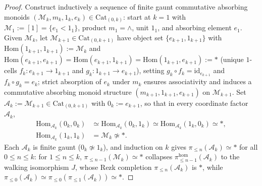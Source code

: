 \begin{proof}
Construct inductively a sequence of finite gaunt commutative absorbing monoids $(\mathcal{M}_k, m_k, 1_k, e_k) \in \mathrm{Cat}_{(0, k)}$: start at $k = 1$ with $\mathcal{M}_1 := [1] = \{e_1 < 1_1\}$, product $m_1 = \wedge$, unit $1_1$, and absorbing element $e_1$. Given $\mathcal{M}_k$, let $\mathcal{M}_{k+1} \in \mathrm{Cat}_{(0, k+1)}$ have object set $\{e_{k+1}, 1_{k+1}\}$ with $\mathrm{Hom}(1_{k+1}, 1_{k+1}) := \mathcal{M}_k$ and $\mathrm{Hom}(e_{k+1}, e_{k+1}) = \mathrm{Hom}(e_{k+1}, 1_{k+1}) = \mathrm{Hom}(1_{k+1}, e_{k+1}) := *$ (unique $1$-cells $f_k : e_{k+1} \to 1_{k+1}$ and $g_k : 1_{k+1} \to e_{k+1}$), setting $g_k \circ f_k = \mathrm{id}_{e_{k+1}}$ and $f_k \circ g_k = e_k$; strict absorption of $e_k$ under $m_k$ ensures associativity and induces a commutative absorbing monoid structure $(m_{k+1}, 1_{k+1}, e_{k+1})$ on $\mathcal{M}_{k+1}$. Set $\mathcal{A}_k := \mathcal{M}_{k+1} \in \mathrm{Cat}_{(0, k+1)}$ with $0_k := e_{k+1}$, so that in every coordinate factor $\mathcal{A}_k$,
\[
  \begin{aligned}
    \mathrm{Hom}_{\mathcal{A}_k}(0_k, 0_k) &\simeq \mathrm{Hom}_{\mathcal{A}_k}(0_k, 1_k) \simeq \mathrm{Hom}_{\mathcal{A}_k}(1_k, 0_k) \simeq *, \\
    \mathrm{Hom}_{\mathcal{A}_k}(1_k, 1_k) &= \mathcal{M}_k \not\simeq *.
  \end{aligned}
\]
Each $\mathcal{A}_k$ is finite gaunt ($0_k \not\simeq 1_k$), and induction on $k$ gives $\pi_{\le n}(\mathcal{A}_k) \simeq *$ for all $0 \le n \le k$: for $1 \le n \le k$, $\pi_{\le n-1}(\mathcal{M}_k) \simeq *$ collapses $\pi_{\le n-1}^{\mathrm{hom}}(\mathcal{A}_k)$ to the walking isomorphism $J$, whose Rezk completion $\pi_{\le n}(\mathcal{A}_k)$ is $*$, while $\pi_{\le 0}(\mathcal{A}_k) \simeq \pi_{\le 0}(\pi_{\le 1}(\mathcal{A}_k)) \simeq *$.


\end{proof}
